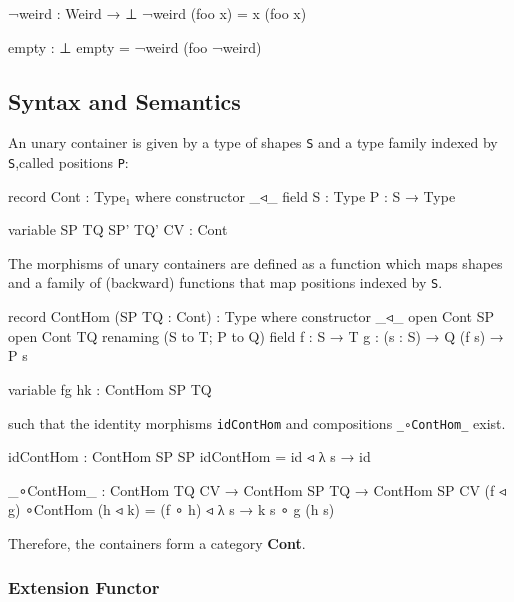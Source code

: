 \begin{code}
¬weird : Weird → ⊥
¬weird (foo x) = x (foo x)

empty : ⊥
empty = ¬weird (foo ¬weird)
\end{code}

\subsection{Syntax and Semantics}

An unary container is given by a type of shapes \texttt{S} and a type family indexed by \texttt{S},called positions \texttt{P}:

\begin{code}
record Cont : Type₁ where
  constructor _◃_
  field
    S : Type
    P : S → Type
\end{code}

\begin{code}[hide]
variable SP TQ SP' TQ' CV : Cont
\end{code}

The morphisms of unary containers are defined as a function which maps shapes and a family of (backward) functions that map positions indexed by \texttt{S}.

\begin{code}
record ContHom (SP TQ : Cont) : Type where
  constructor _◃_
  open Cont SP
  open Cont TQ renaming (S to T; P to Q)
  field
    f : S → T
    g : (s : S) → Q (f s) → P s
\end{code}

\begin{code}[hide]
variable fg hk : ContHom SP TQ
\end{code}

such that the identity morphisms \texttt{idContHom} and compositions \texttt{\_∘ContHom\_} exist.

\begin{code}
idContHom : ContHom SP SP
idContHom = id ◃ λ s → id

_∘ContHom_ : ContHom TQ CV → ContHom SP TQ → ContHom SP CV
(f ◃ g) ∘ContHom (h ◃ k) = (f ∘ h) ◃ λ s → k s ∘ g (h s)
\end{code}

Therefore, the containers form a category \textbf{Cont}.

\subsubsection*{Extension Functor}

